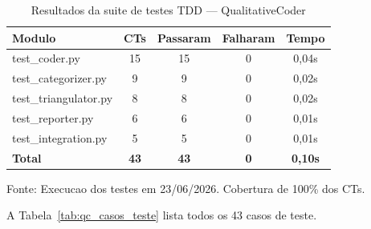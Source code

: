 \begin{table}[htbp]
    \centering
    \caption{Resultados da suite de testes TDD --- QualitativeCoder}
    \label{tab:qc_tdd_resultados}
    \small
    \begin{tabular}{lcccc}
        \toprule
        \textbf{Modulo} & \textbf{CTs} & \textbf{Passaram} & \textbf{Falharam} & \textbf{Tempo} \\
        \midrule
        test\_coder.py & 15 & 15 & 0 & 0,04s \\
        test\_categorizer.py & 9 & 9 & 0 & 0,02s \\
        test\_triangulator.py & 8 & 8 & 0 & 0,02s \\
        test\_reporter.py & 6 & 6 & 0 & 0,01s \\
        test\_integration.py & 5 & 5 & 0 & 0,01s \\
        \midrule
        \textbf{Total} & \textbf{43} & \textbf{43} & \textbf{0} & \textbf{0,10s} \\
        \bottomrule
    \end{tabular}
    \par\medskip
    \footnotesize{Fonte: Execucao dos testes em 23/06/2026. Cobertura de 100\% dos CTs.}
\end{table}

A Tabela~\ref{tab:qc_casos_teste} lista todos os 43 casos de teste.

